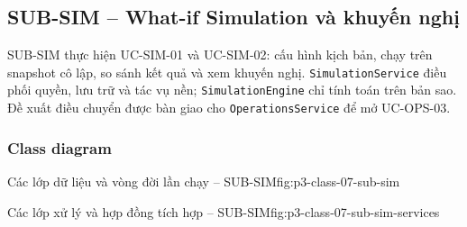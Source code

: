 \par\medskip
\noindent\begin{minipage}{\linewidth}
\subsection{SUB-SIM -- What-if Simulation và khuyến nghị}
SUB-SIM thực hiện UC-SIM-01 và UC-SIM-02: cấu hình kịch bản, chạy trên snapshot cô lập, so sánh kết quả và xem khuyến nghị. \texttt{SimulationService} điều phối quyền, lưu trữ và tác vụ nền; \texttt{SimulationEngine} chỉ tính toán trên bản sao. Đề xuất điều chuyển được bàn giao cho \texttt{OperationsService} để mở UC-OPS-03.

\subsubsection{Class diagram}
  {Các lớp dữ liệu và vòng đời lần chạy -- SUB-SIM}{fig:p3-class-07-sub-sim}
\end{minipage}\par

\clearpage
{}
  {Các lớp xử lý và hợp đồng tích hợp -- SUB-SIM}{fig:p3-class-07-sub-sim-services}

